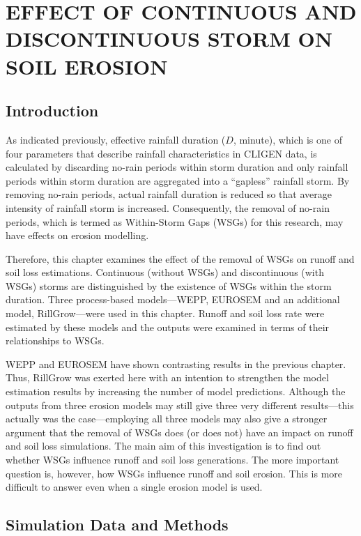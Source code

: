 \chapter{EFFECT OF CONTINUOUS AND DISCONTINUOUS STORM ON SOIL EROSION}
\label{sec:EFFECTSOFCONTINOUSANDDISCONTINUSSTORM}

\section{Introduction}
\label{sec:ContinousAndDiscontinousStormIntroduction}

As indicated previously, effective rainfall duration ($D$, minute), which
is one of four parameters that describe rainfall characteristics in CLIGEN
data, is calculated by discarding no-rain periods within storm duration and
only rainfall periods within storm duration are aggregated into a ``gapless''
rainfall storm. By removing no-rain periods, actual rainfall duration is
reduced so that average intensity of rainfall storm is increased. Consequently,
the removal of no-rain periods, which is termed as Within-Storm Gaps (WSGs) for
this research, may have effects on erosion modelling.

Therefore, this chapter examines the effect of the removal of WSGs on
runoff and soil loss estimations. Continuous (without WSGs) and discontinuous
(with WSGs) storms are distinguished by the existence of WSGs within the storm
duration. Three process-based models---WEPP, EUROSEM and an additional model,
RillGrow---were used in this chapter. Runoff and soil loss rate were estimated
by these models and the outputs were examined in terms of their relationships to
WSGs.

WEPP and EUROSEM have shown contrasting results in the previous chapter. Thus,
RillGrow was exerted here with an intention to strengthen the model estimation
results by increasing the number of model predictions. Although the outputs from
three erosion models may still give three very different results---this actually
was the case---employing all three models may also give a stronger argument that
the removal of WSGs does (or does not) have an impact on runoff and soil loss
simulations.
The main aim of this investigation is to find out whether WSGs influence runoff
and soil loss generations. The more important question is, however, how WSGs
influence runoff and soil erosion. This is more difficult to answer even when a
single erosion model is used.

\section{Simulation Data and Methods}
\label{sec:ContinousAndDiscontinousStormMethods}

